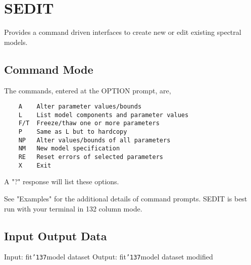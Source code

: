 \documentclass{book}
\renewcommand{\_}{{\tt\char'137}}     %
\begin{document}
\section{SEDIT}
Provides a command driven interfaces to create new or edit existing
spectral models.
 
\subsection{Command Mode}
The commands, entered at the OPTION prompt, are,
 
\begin{verbatim}
    A    Alter parameter values/bounds
    L    List model components and parameter values
    F/T  Freeze/thaw one or more parameters
    P    Same as L but to hardcopy
    NP   Alter values/bounds of all parameters
    NM   New model specification
    RE   Reset errors of selected parameters
    X    Exit
\end{verbatim}
A "?" response will list these options.
 
See "Examples" for the additional details of command prompts. SEDIT
is best run with your terminal in 132 column mode.
 
\subsection{Input Output Data}
Input: fit\_model dataset
Output: fit\_model dataset modified
\end{document}

